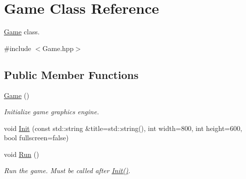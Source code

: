 \hypertarget{classGame}{}\section{Game Class Reference}
\label{classGame}


\hyperlink{classGame}{Game} class.  




{\ttfamily \#include $<$Game.\+hpp$>$}

\subsection*{Public Member Functions}
\begin{DoxyCompactItemize}
\item 
\mbox{\label{classGame_ad59df6562a58a614fda24622d3715b65}} 
\hyperlink{classGame_ad59df6562a58a614fda24622d3715b65}{Game} ()
\begin{DoxyCompactList}\small\item\em Initialize game graphics engine. \end{DoxyCompactList}\item 
void \hyperlink{classGame_aa3ad98174079ae07b15cd6d29a04edc3}{Init} (const std\+::string \&title=std\+::string(), int width=800, int height=600, bool fullscreen=false)
\item 
\mbox{\label{classGame_a96341ca5b54d90adc3ecb3bf0bcd2312}} 
void \hyperlink{classGame_a96341ca5b54d90adc3ecb3bf0bcd2312}{Run} ()
\begin{DoxyCompactList}\small\item\em Run the game. Must be called after \hyperlink{classGame_aa3ad98174079ae07b15cd6d29a04edc3}{Init()}. \end{DoxyCompactList}\end{DoxyCompactItemize}
